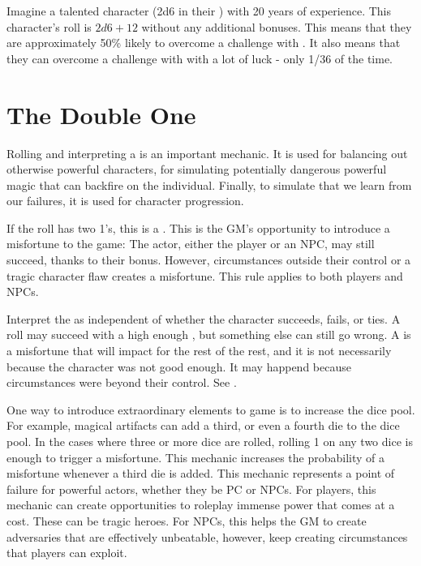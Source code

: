 \begin{marginNote}
	
\end{marginNote}



Imagine a talented character (2d6 in their ) with 20 years of experience.
This character's roll is $2d6 + 12$ without any additional bonuses.
This means that they are approximately 50\% likely to overcome a challenge with .
It also means that they can overcome a challenge with  with a lot of luck - only 1/36 of the time.\\


\section{The Double One}

Rolling and interpreting a  is an important
mechanic. It is used for balancing out otherwise powerful
characters, for simulating potentially dangerous powerful magic
that can backfire on the individual. Finally, to simulate
that we learn from our failures, it is used for character
progression.

If the roll has two 1's, this is a .
This is the GM's opportunity to introduce a misfortune to the game:
The actor, either the player or an NPC, may still succeed, thanks to their bonus.
However, circumstances outside their control or a tragic character flaw creates a misfortune.
This rule applies to both players and NPCs.

Interpret the  as independent of whether the character
succeeds, fails, or ties. A roll may succeed with a high enough ,
but something else can still go wrong. A  is a misfortune that will
impact for the rest of the rest, and it is not necessarily
because the character was not good enough. It may happend because circumstances were
beyond their control. See .

One way to introduce extraordinary elements to game is to increase the dice pool.
For example, magical artifacts can add a third, or even a fourth die to the dice pool.
In the cases where three or more dice are rolled,
rolling 1 on any two dice is enough to trigger a misfortune.
This mechanic increases the probability of a misfortune
whenever a third die is added. This mechanic represents
a point of failure for powerful actors, whether they be
PC or NPCs. For players, this mechanic can create
opportunities to roleplay immense power that comes at a cost.
These can be tragic heroes. For NPCs, this helps the GM
to create adversaries that are effectively unbeatable,
however, keep creating circumstances that players can exploit.

